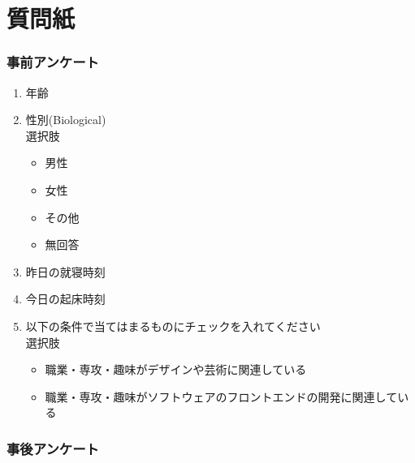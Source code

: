 \chapter{質問紙}
\subsection{事前アンケート}
\begin{enumerate}
  \item 年齢
  \item 性別(Biological)
  \\選択肢
 \begin{itemize}
  \item 男性
  \item 女性
  \item その他
  \item 無回答
\end{itemize}
  \item 昨日の就寝時刻
  \item 今日の起床時刻
  \item 以下の条件で当てはまるものにチェックを入れてください\\
  選択肢
  \begin{itemize}
  \item 職業・専攻・趣味がデザインや芸術に関連している
  \item 職業・専攻・趣味がソフトウェアのフロントエンドの開発に関連している
\end{itemize}
\end{enumerate}

\subsection{事後アンケート}

